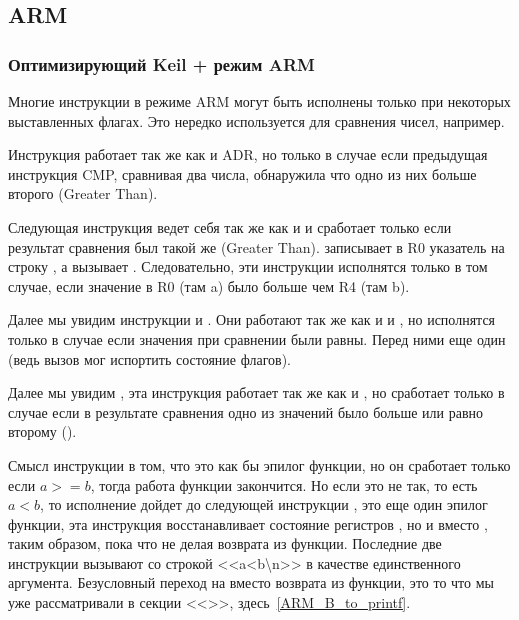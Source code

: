 ﻿%
\subsection{ARM}

\subsubsection{Оптимизирующий Keil + режим ARM}



Многие инструкции в режиме ARM могут быть исполнены только при некоторых выставленных флагах.
Это нередко используется для сравнения чисел, например.

Инструкция  работает так же как и ADR, но только в случае если предыдущая инструкция CMP,
сравнивая два числа, обнаружила что одно из них больше второго (Greater Than).

Следующая инструкция  ведет себя так же как и  и сработает только если 
результат сравнения был такой же (Greater Than).  записывает в R0 указатель на строку 
,
а  вызывает \printf. Следовательно, эти инструкции исполнятся только в том случае, если значение
в R0 (там a) было больше чем R4 (там b). 

Далее мы увидим инструкции  и . Они работают так же как и  и , 
но исполнятся только в случае если
значения при сравнении были равны. Перед ними еще один \CMP (ведь вызов \printf мог испортить состояние флагов).

Далее мы увидим , эта инструкция работает так же как и , но сработает только в случае если 
в результате сравнения одно из значений было больше или равно второму ().

Смысл инструкции  в том, что это как бы эпилог функции, но он сработает только
если $a>=b$, тогда работа функции закончится. 
Но если это не так, то есть $a<b$, то исполнение дойдет до следующей инструкции 
, это еще один эпилог функции, эта инструкция восстанавливает состояние регистров
, но и \LR вместо \PC, таким образом, пока что не делая возврата из функции. 
Последние две инструкции вызывают
\printf со строкой <<a<b\textbackslash{}n>> в качестве единственного аргумента. Безусловный переход на \printf вместо возврата
из функции, это то что мы уже рассматривали в секции <<\PrintfSeveralArgumentsSectionName>>, 
здесь~\ref{ARM_B_to_printf}.

